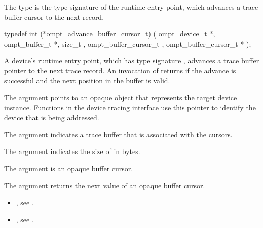\subsubsection{}
\label{sec:ompt_advance_buffer_cursor_t}

\summary
The  type is the type signature of the 
 runtime entry point, which advances
a trace buffer cursor to the next record.

\format
\begin{ccppspecific}
\begin{omptInquiry}
typedef int (*ompt_advance_buffer_cursor_t) (
  ompt_device_t *,
  ompt_buffer_t *,
  size_t ,
  ompt_buffer_cursor_t ,
  ompt_buffer_cursor_t *
);
\end{omptInquiry}
\end{ccppspecific}

\descr
A device's  runtime entry point, which has 
type signature , advances a trace buffer
pointer to the next trace record. An invocation of 
 returns  if the advance is 
successful and the next position in the buffer is valid.

\argdesc
The  argument points to an opaque object that represents
the target device instance. Functions in the device tracing interface
use this pointer to identify the device that is being addressed.

The  argument indicates a trace buffer that is associated
with the cursors.

The argument  indicates the size of  in bytes.

The  argument is an opaque buffer cursor.

The  argument returns the next value of an opaque buffer cursor.

\crossreferences
\begin{itemize}
\item {}, see .

\item {}, see .
\end{itemize}



\subsubsection{}
\label{sec:ompt_get_record_type_t}


